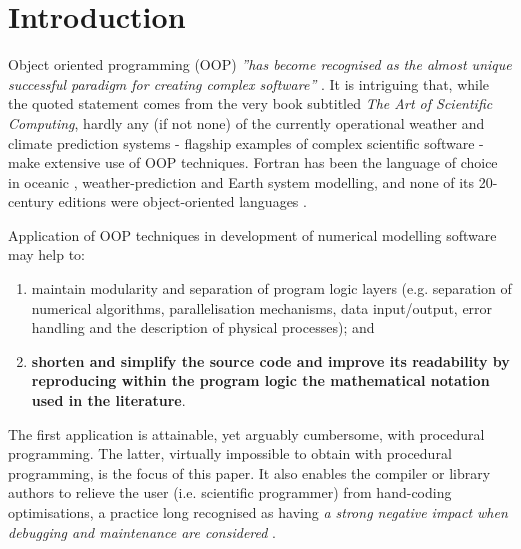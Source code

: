 \documentclass[final,5p,times,twocolumn]{elsarticle}
\begin{document}

  \section{Introduction}

  Object oriented programming (OOP) {\em ''has become recognised as the almost unique successful 
    paradigm for creating complex software''} \citep[][Sec.~1.3]{Press_et_al_2007}.
  It is intriguing that, while the quoted statement comes from the very book subtitled 
   {\em The Art of Scientific Computing}, hardly any (if not none) of the currently operational 
    weather and climate prediction systems - flagship examples of complex scientific software - 
    make extensive use of OOP techniques.
  Fortran has been the language of choice in oceanic \citep{Griffies_et_al_2000}, 
    weather-prediction \citep{Sundberg_2009} and Earth system \citep{Legutke_2012} modelling, 
    and none of its 20-century editions were object-oriented languages \citep[see e.g.][for discussion]{Norton_et_al_2007}.

  Application of OOP techniques in development of numerical modelling software may help to:
  \begin{enumerate}[label=(\roman*), leftmargin=*, widest=ii]
    \item{maintain modularity and separation of program logic layers (e.g. separation of
      numerical algorithms, parallelisation mechanisms, data input/output, error handling and
      the description of physical processes); and}
    \item{{\bf shorten and simplify the source code and improve its readability by reproducing within 
      the program logic the mathematical notation used in the literature}.}
  \end{enumerate}
  The first application is attainable, yet arguably cumbersome, with procedural programming.
  The latter, virtually impossible to obtain with procedural programming, is the focus of this paper.
  It also enables the compiler or library authors to relieve the user (i.e. scientific programmer)
    from hand-coding optimisations, a practice long recognised as having {\em a strong negative impact when debugging
    and maintenance are considered} \citep{Knuth_1974}.
\end{document}
